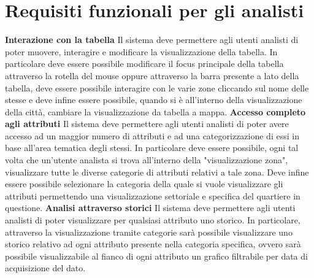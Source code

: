     \section{Requisiti funzionali per gli analisti}
        \begin{rfList}
            \rfItem \textbf{Interazione con la tabella} Il sistema deve permettere agli utenti analisti di poter muovere, interagire e modificare la visualizzazione della tabella. In particolare deve essere possibile modificare il focus principale della tabella attraverso la rotella del mouse oppure attraverso la barra presente a lato della tabella, deve essere possibile interagire con le varie zone cliccando sul nome delle stesse e deve infine essere possibile, quando si è all'interno della visualizzazione della città, cambiare la visualizzazione da tabella a mappa.
            \rfItem \textbf{Accesso completo agli attributi} Il sistema deve permettere agli utenti analisti di poter avere accesso ad un maggior numero di attributi e ad una categorizzazione di essi in base all'area tematica degli stessi. In particolare deve essere possibile, ogni tal volta che un'utente analista si trova all'interno della "visualizzazione zona", visualizzare tutte le diverse categorie di attributi relativi a tale zona. Deve infine essere possibile selezionare la categoria della quale si vuole visualizzare gli attributi permettendo una visualizzazione settoriale e specifica del quartiere in questione.
            \rfItem \textbf{Analisi attraverso storici} Il sistema deve permettere agli utenti analisti di poter visualizzare per qualsiasi attributo uno storico. In particolare, attraverso la visualizzazione tramite categorie sarà possibile visualizzare uno storico relativo ad ogni attributo presente nella categoria specifica, ovvero sarà possibile visualizzabile al fianco di ogni attributo un grafico filtrabile per data di acquisizione del dato.
        \end{rfList}
